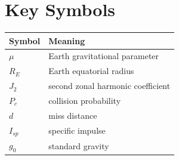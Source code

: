 \documentclass[11pt,a4paper]{article}
\begin{document}
\section*{Key Symbols}
\begin{center}
\begin{tabular}{ll}
\toprule
Symbol & Meaning \\
\midrule
$\mu$ & Earth gravitational parameter \\
$R_E$ & Earth equatorial radius \\
$J_2$ & second zonal harmonic coefficient \\
$P_c$ & collision probability \\
$d$ & miss distance \\
$I_{sp}$ & specific impulse \\
$g_0$ & standard gravity \\
\bottomrule
\end{tabular}
\end{center}
\end{document}
